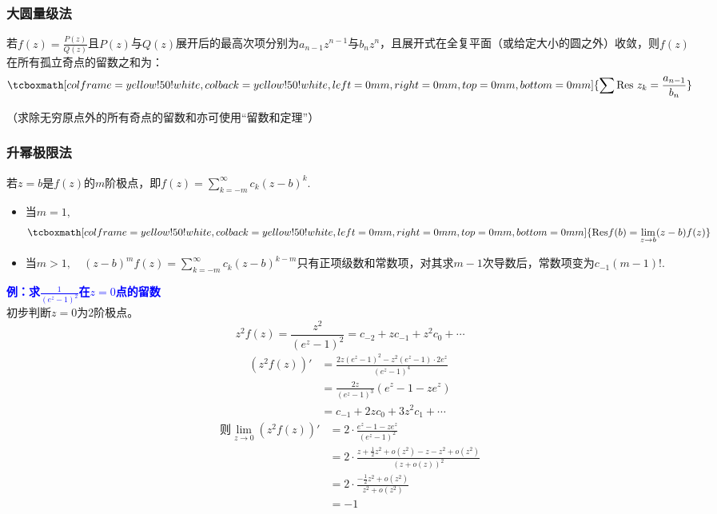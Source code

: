 \documentclass[UTF8,12pt]{ctexart}
\newcommand\stress{\tcboxmath[colframe=yellow!50!white,colback=yellow!50!white,left=0mm,right=0mm,top=0mm,bottom=0mm]}
\newenvironment{itemizeb}{\begin{itemize}}{\end{itemize}}
\begin{document}
\subsubsection{大圆量级法}
若$f(z)=\frac{P(z)}{Q(z)}$且$P(z)$与$Q(z)$展开后的最高次项分别为$a_{n-1}z^{n-1}$与$b_nz^n$，且展开式在全复平面（或给定大小的圆之外）收敛，则$f(z)$在所有孤立奇点的留数之和为：
\begin{equation}
    \stress{\sum{\rm Res\ }z_k=\frac{a_{n-1}}{b_n}}
\end{equation}

（求除无穷原点外的所有奇点的留数和亦可使用“留数和定理”）

\subsubsection{升幂极限法}
若$z=b$是$f(z)$的$m$阶极点，即$f(z)=\sum_{k=-m}^\infty c_k(z-b)^k$.
\begin{itemizeb}
    \item 当$m=1,$\begin{equation}
        \stress{{\rm Res}f(b)=\lim_{z\rightarrow b}(z-b)f(z)}
    \end{equation}
    \item 当$m>1,\quad (z-b)^mf(z)=\sum_{k=-m}^\infty c_{k}(z-b)^{k-m}$只有正项级数和常数项，对其求$m-1$次导数后，常数项变为$c_{-1}(m-1)!$.        
\end{itemizeb}

\begin{ebox}
    \textcolor{blue}{\bf 例：求$\frac{1}{(e^z-1)^2}$在$z=0$点的留数\vspace{1em}\\}
    初步判断$z=0$为2阶极点。
    \begin{equation}
        z^2f(z)=\frac{z^2}{(e^z-1)^2}=c_{-2}+zc_{-1}+z^2c_0+\cdots
    \end{equation} 
    \begin{equation}
        \begin{aligned}
            \left(z^2f(z)\right)'&=\frac{2z(e^z-1)^2-z^2(e^z-1)\cdot 2e^z}{(e^z-1)^4}\\
            &=\frac{2z}{(e^z-1)^3}(e^z-1-ze^z)\\&=c_{-1}+2zc_0+3z^2c_1+\cdots
        \end{aligned}
    \end{equation}
    \begin{equation}
        \begin{aligned}
            \text{则}\lim_{z\rightarrow 0}\left(z^2f(z)\right)'&=2\cdot \frac{e^z-1-ze^z}{(e^z-1)^2}\\
            &=2\cdot \frac{z+\frac{1}{2}z^2+o(z^2)-z-z^2+o(z^2)}{(z+o(z))^2}\\
            &=2\cdot \frac{-\frac{1}{2}z^2+o(z^2)}{z^2+o(z^2)}\\
            &=-1
        \end{aligned}
    \end{equation}
\end{ebox}
\end{document}
